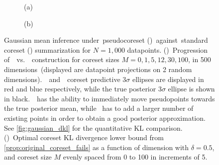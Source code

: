 \captionsetup[subfigure]{labelformat=empty}
\begin{figure}[t!]
	\centering 
\begin{subfigure}[b]{.47\textwidth} 
	\caption{(a)\label{fig:gaussian_coreset_points}}
	\end{subfigure}
\hfill\qquad
\centering
\begin{subfigure}[b]{0.47\textwidth}
	\caption{(b)\label{fig:klbound}}
\end{subfigure}
\caption{Gaussian mean inference under~pseudocoreset (\psvi)~against~standard coreset (\sparsevi) summarization for $N=1,000$  datapoints. ()~Progression of~\psvi~vs.~\sparsevi~construction for coreset sizes $M=0, 1, 5, 12, 30, 100$, in 500 dimensions~(displayed are datapoint projections on 2 random dimensions).~\psvi~and~\sparsevi~coreset predictive $3\sigma$ ellipses are displayed in red and blue respectively, while the true posterior $3\sigma$ ellipse is shown in black.~\psvi~has the ability to immediately move pseudopoints towards the  true posterior mean, while \sparsevi~has to add a larger number of existing points in order to obtain a good posterior approximation. See \cref{fig:gaussian_dkl} for the quantitative KL comparison.
()~Optimal coreset KL divergence lower bound from \cref{prop:original_coreset_fails} as a function of dimension with $\delta = 0.5$, and  coreset size $M$ evenly spaced from 0 to 100 in increments of 5.}
\end{figure}

